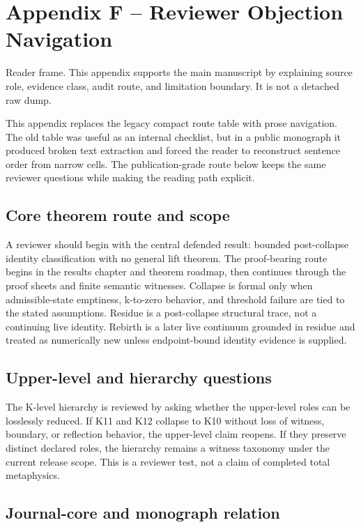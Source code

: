 \section{Appendix F -- Reviewer Objection Navigation}
Reader frame. This appendix supports the main manuscript by explaining source role, evidence class, audit route, and limitation boundary. It is not a detached raw dump.


\label{sec:oc13-reviewer-navigation}

This appendix replaces the legacy compact route table with prose navigation. The old table was useful as an internal checklist, but in a public monograph it produced broken text extraction and forced the reader to reconstruct sentence order from narrow cells. The publication-grade route below keeps the same reviewer questions while making the reading path explicit.


\subsection{Core theorem route and scope}

A reviewer should begin with the central defended result: bounded post-collapse identity classification with no general lift theorem. The proof-bearing route begins in the results chapter and theorem roadmap, then continues through the proof sheets and finite semantic witnesses. Collapse is formal only when admissible-state emptiness, k-to-zero behavior, and threshold failure are tied to the stated assumptions. Residue is a post-collapse structural trace, not a continuing live identity. Rebirth is a later live continuum grounded in residue and treated as numerically new unless endpoint-bound identity evidence is supplied.


\subsection{Upper-level and hierarchy questions}

The K-level hierarchy is reviewed by asking whether the upper-level roles can be losslessly reduced. If K11 and K12 collapse to K10 without loss of witness, boundary, or reflection behavior, the upper-level claim reopens. If they preserve distinct declared roles, the hierarchy remains a witness taxonomy under the current release scope. This is a reviewer test, not a claim of completed total metaphysics.


\subsection{Journal-core and monograph relation}

